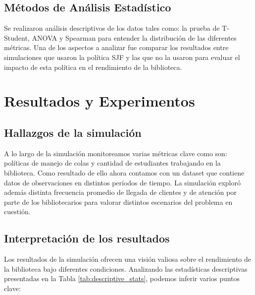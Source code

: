 \documentclass[10pt,twocolumn]{article}
\begin{document}
\subsection{Métodos de Análisis Estadístico}
Se realizaron análisis descriptivos de los datos tales como: la prueba de T-Student, ANOVA y Spearman para entender la distribución de las diferentes métricas. Una de los aspectos a analizar fue comparar los resultados entre simulaciones que usaron la política SJF y las que no la usaron para evaluar el impacto de esta política en el rendimiento de la biblioteca.






\section{Resultados y Experimentos}
\subsection{Hallazgos de la simulación}
A lo largo de la simulación monitoreamos varias métricas clave como son: políticas de manejo de colas y cantidad de estudiantes trabajando en la biblioteca. Como resultado de ello ahora contamos con un dataset que contiene datos de observaciones en distintos períodos de tiempo. La simulación exploró además distinta frecuencia promedio de llegada de clientes y de atención por parte de los bibliotecarios para valorar distintos escenarios del problema en cuestión.

\subsection{Interpretación de los resultados}
Los resultados de la simulación ofrecen una visión valiosa sobre el rendimiento de la biblioteca bajo diferentes condiciones. Analizando las estadísticas descriptivas presentadas en la Tabla \ref{tab:descriptive_stats}, podemos inferir varios puntos clave:
\end{document}
